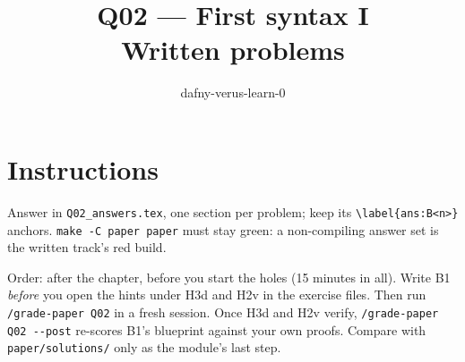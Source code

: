 \documentclass[11pt]{article}
\title{Q02 --- First syntax I \\ \large Written problems}
\author{dafny-verus-learn-0}
\date{}
\begin{document}
\maketitle

\section*{Instructions}
Answer in \texttt{Q02\_answers.tex}, one section per problem; keep its
\verb+\label{ans:B<n>}+ anchors. \texttt{make -C paper paper} must stay green:
a non-compiling answer set is the written track's red build.

Order: after the chapter, before you start the holes (15 minutes in all). Write
B1 \emph{before} you open the hints under H3d and H2v in the exercise files.
Then run \texttt{/grade-paper Q02} in a fresh session. Once H3d and H2v verify,
\verb+/grade-paper Q02 --post+ re-scores B1's blueprint against your own
proofs. Compare with \texttt{paper/solutions/} only as the module's last step.
\end{document}
